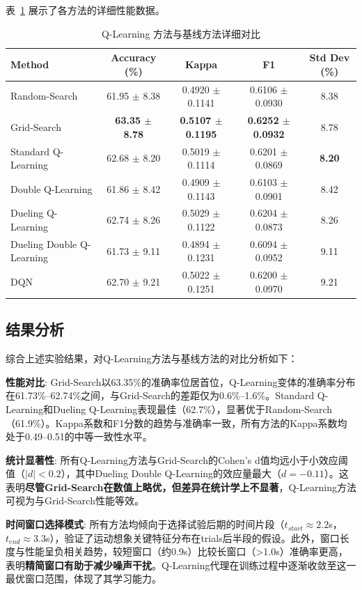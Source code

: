 表~\ref{tab:ql_comparison} 展示了各方法的详细性能数据。

\begin{table}[H]
\centering
\caption{Q-Learning 方法与基线方法详细对比}
\label{tab:ql_comparison}
\small
\begin{tabular}{lcccc}
\hline
\textbf{Method}  & \textbf{Accuracy (\%)} & \textbf{Kappa} & \textbf{F1} & \textbf{Std Dev (\%)}  \\
\hline
Random-Search  & 61.95 $\pm$ 8.38 & 0.4920 $\pm$ 0.1141 & 0.6106 $\pm$ 0.0930 & 8.38  \\
Grid-Search  & \textbf{63.35 $\pm$ 8.78} & \textbf{0.5107 $\pm$ 0.1195} & \textbf{0.6252 $\pm$ 0.0932} & 8.78  \\
Standard Q-Learning  & 62.68 $\pm$ 8.20 & 0.5019 $\pm$ 0.1114 & 0.6201 $\pm$ 0.0869 & \textbf{8.20}  \\
Double Q-Learning  & 61.86 $\pm$ 8.42 & 0.4909 $\pm$ 0.1143 & 0.6103 $\pm$ 0.0901 & 8.42  \\
Dueling Q-Learning  & 62.74 $\pm$ 8.26 & 0.5029 $\pm$ 0.1122 & 0.6204 $\pm$ 0.0873 & 8.26  \\
Dueling Double Q-Learning  & 61.73 $\pm$ 9.11 & 0.4894 $\pm$ 0.1231 & 0.6094 $\pm$ 0.0952 & 9.11  \\
DQN  & 62.70 $\pm$ 9.21 & 0.5022 $\pm$ 0.1251 & 0.6200 $\pm$ 0.0970 & 9.21  \\
\hline
\end{tabular}
\end{table}

\subsection{结果分析}
\label{subsec:ql_analysis}

综合上述实验结果，对Q-Learning方法与基线方法的对比分析如下：

\textbf{性能对比}: Grid-Search以63.35\%的准确率位居首位，Q-Learning变体的准确率分布在61.73\%--62.74\%之间，与Grid-Search的差距仅为0.6\%--1.6\%。Standard Q-Learning和Dueling Q-Learning表现最佳（62.7\%），显著优于Random-Search（61.9\%）。Kappa系数和F1分数的趋势与准确率一致，所有方法的Kappa系数均处于0.49--0.51的中等一致性水平。

\textbf{统计显著性}: 所有Q-Learning方法与Grid-Search的Cohen's d值均远小于小效应阈值（$|d| < 0.2$），其中Dueling Double Q-Learning的效应量最大（$d=-0.11$）。这表明\textbf{尽管Grid-Search在数值上略优，但差异在统计学上不显著}，Q-Learning方法可视为与Grid-Search性能等效。

\textbf{时间窗口选择模式}: 所有方法均倾向于选择试验后期的时间片段（$t_{start} \approx 2.2$s，$t_{end} \approx 3.3$s），验证了运动想象关键特征分布在trials后半段的假设。此外，窗口长度与性能呈负相关趋势，较短窗口（约0.9s）比较长窗口（>1.0s）准确率更高，表明\textbf{精简窗口有助于减少噪声干扰}。Q-Learning代理在训练过程中逐渐收敛至这一最优窗口范围，体现了其学习能力。

